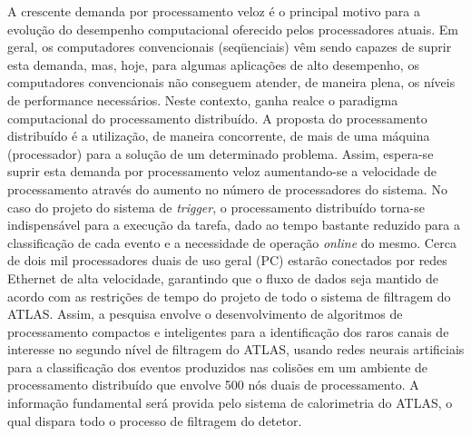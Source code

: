 A crescente demanda por processamento veloz é o principal motivo para a evolução do desempenho computacional oferecido pelos processadores atuais. Em geral, os computadores convencionais (seqüenciais) vêm sendo capazes de suprir esta demanda, mas, hoje, para algumas aplicações de alto desempenho, os computadores convencionais não conseguem atender, de maneira plena, os níveis de performance necessários. Neste contexto, ganha realce o paradigma computacional do processamento distribuído. A proposta do processamento distribuído é a utilização, de maneira concorrente, de mais de uma máquina (processador) para a solução de um determinado problema. Assim, espera-se suprir esta demanda por processamento veloz aumentando-se a velocidade de processamento através do aumento no número de processadores do sistema. No caso do projeto do sistema de \emph{trigger}, o processamento distribuído torna-se indispensável para a execução da tarefa, dado ao tempo bastante reduzido para a classificação de cada evento e a necessidade de operação \emph{online} do mesmo. Cerca de dois mil processadores duais de uso geral (PC) estarão conectados por redes Ethernet de alta velocidade, garantindo que o fluxo de dados seja mantido de acordo com as restrições de tempo do projeto de todo o sistema de filtragem do ATLAS. Assim, a pesquisa envolve o desenvolvimento de algoritmos de processamento compactos e inteligentes para a identificação dos raros canais de interesse no segundo nível de filtragem do ATLAS, usando redes neurais artificiais para a classificação dos eventos produzidos nas colisões em um ambiente de processamento distribuído que envolve 500 nós duais de processamento. A informação fundamental será provida pelo sistema de calorimetria do ATLAS, o qual dispara todo o processo de filtragem do detetor.


